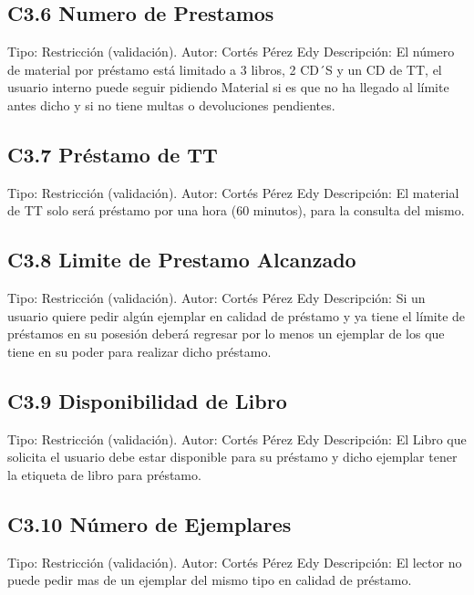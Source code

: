 \subsection{C3.6 Numero de Prestamos }
	\UCli Tipo: Restricción (validación).
	\UCli Autor: Cortés Pérez Edy
	\UCli Descripción: El número de material por préstamo está limitado a 3 libros, 2 CD´S y un CD de TT, el usuario interno puede seguir pidiendo Material si es que no ha llegado al límite antes dicho y si no tiene multas o devoluciones pendientes.
	
\subsection{C3.7 Préstamo de TT }
	\UCli Tipo: Restricción (validación).
	\UCli Autor: Cortés Pérez Edy
	\UCli Descripción: El material de TT solo será préstamo por una hora (60 minutos), para la consulta del mismo.

\subsection{C3.8 Limite de Prestamo Alcanzado }
	\UCli Tipo: Restricción (validación).
	\UCli Autor: Cortés Pérez Edy
	\UCli Descripción: Si un usuario quiere pedir algún ejemplar en calidad de préstamo y ya tiene el límite de préstamos en su posesión deberá regresar por lo menos un ejemplar de los que tiene en su poder para realizar dicho préstamo.

\subsection{C3.9 Disponibilidad de Libro }
	\UCli Tipo: Restricción (validación).
	\UCli Autor: Cortés Pérez Edy
	\UCli Descripción: El Libro que solicita el usuario debe estar disponible para su préstamo y dicho ejemplar tener la etiqueta de libro para préstamo.
	
\subsection{C3.10 Número de Ejemplares }
	\UCli Tipo: Restricción (validación).
	\UCli Autor: Cortés Pérez Edy
	\UCli Descripción: El lector no puede pedir mas de un ejemplar del mismo tipo en calidad de préstamo.
	
